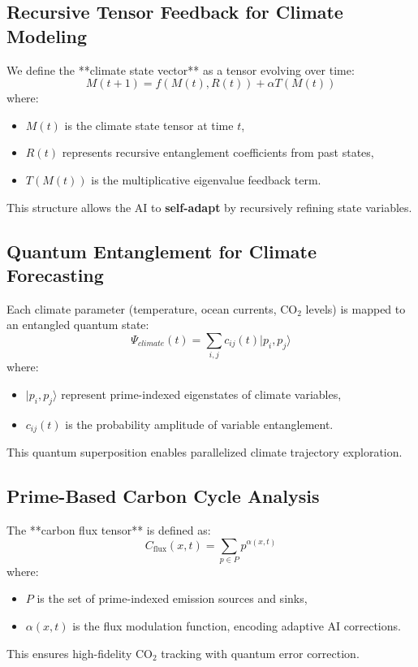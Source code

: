 \documentclass{article}
\theoremstyle{plain}
\begin{document}
\subsection{Recursive Tensor Feedback for Climate Modeling}
We define the **climate state vector** as a tensor evolving over time:
\begin{equation}
    M(t+1) = f(M(t), R(t)) + \alpha T(M(t))
\end{equation}
where:
\begin{itemize}
    \item \( M(t) \) is the climate state tensor at time \( t \),
    \item \( R(t) \) represents recursive entanglement coefficients from past states,
    \item \( T(M(t)) \) is the multiplicative eigenvalue feedback term.
\end{itemize}

This structure allows the AI to \textbf{self-adapt} by recursively refining state variables.

\subsection{Quantum Entanglement for Climate Forecasting}
Each climate parameter (temperature, ocean currents, CO$_2$ levels) is mapped to an entangled quantum state:
\begin{equation}
    \Psi_{climate}(t) = \sum_{i,j} c_{ij}(t) |p_i, p_j \rangle
\end{equation}
where:
\begin{itemize}
    \item \( |p_i, p_j \rangle \) represent prime-indexed eigenstates of climate variables,
    \item \( c_{ij}(t) \) is the probability amplitude of variable entanglement.
\end{itemize}
This quantum superposition enables parallelized climate trajectory exploration.

\subsection{Prime-Based Carbon Cycle Analysis}
The **carbon flux tensor** is defined as:
\begin{equation}
    C_{\text{flux}}(x,t) = \sum_{p \in P} p^{\alpha(x,t)}
\end{equation}
where:
\begin{itemize}
    \item \( P \) is the set of prime-indexed emission sources and sinks,
    \item \( \alpha(x,t) \) is the flux modulation function, encoding adaptive AI corrections.
\end{itemize}
This ensures high-fidelity CO$_2$ tracking with quantum error correction.
\end{document}
